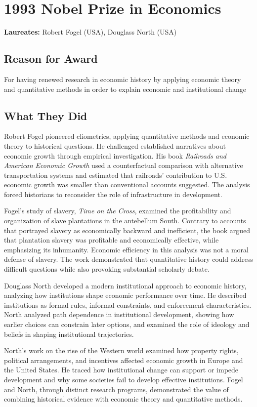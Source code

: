 \chapter{1993 Nobel Prize in Economics}
\textbf{Laureates: }Robert Fogel (USA), Douglass North (USA)

\section*{Reason for Award}
For having renewed research in economic history by applying economic theory and
quantitative methods in order to explain economic and institutional change

\section{What They Did}
Robert Fogel pioneered cliometrics, applying quantitative methods and economic
theory to historical questions. He challenged established narratives about
economic growth through empirical investigation. His book \textit{Railroads
and American Economic Growth} used a counterfactual comparison with alternative
transportation systems and estimated that railroads' contribution to U.S.
economic growth was smaller than conventional accounts suggested. The analysis
forced historians to reconsider the role of infrastructure in development.

Fogel's study of slavery, \textit{Time on the Cross}, examined the profitability
and organization of slave plantations in the antebellum South. Contrary to
accounts that portrayed slavery as economically backward and inefficient, the
book argued that plantation slavery was profitable and economically effective,
while emphasizing its inhumanity. Economic efficiency in this analysis was not
a moral defense of slavery. The work demonstrated that quantitative history
could address difficult questions while also provoking substantial scholarly
debate.

Douglass North developed a modern institutional approach to economic history,
analyzing how institutions shape economic performance over time. He described
institutions as formal rules, informal constraints, and enforcement
characteristics. North analyzed path dependence in institutional development,
showing how earlier choices can constrain later options, and examined the role
of ideology and beliefs in shaping institutional trajectories.

North's work on the rise of the Western world examined how property rights,
political arrangements, and incentives affected economic growth in Europe and
the United States. He traced how institutional change can support or impede
development and why some societies fail to develop effective institutions.
Fogel and North, through distinct research programs, demonstrated the value of
combining historical evidence with economic theory and quantitative methods.

